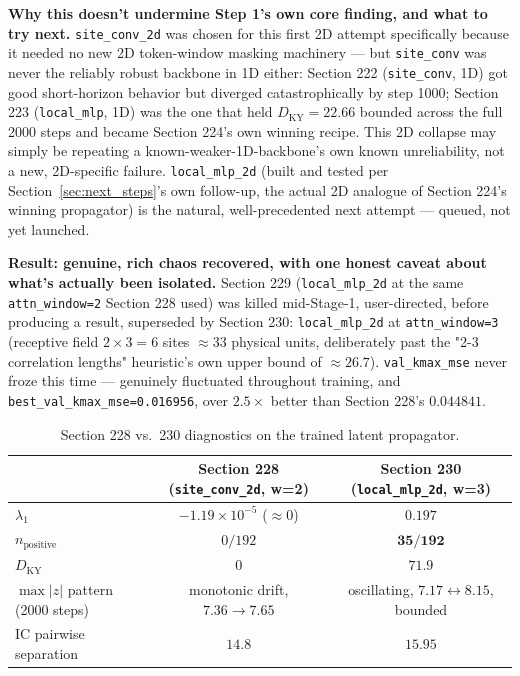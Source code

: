 \documentclass[11pt]{article}
\begin{document}
\textbf{Why this doesn't undermine Step 1's own core finding, and what
to try next.} \texttt{site\_conv\_2d} was chosen for this first 2D
attempt specifically because it needed no new 2D token-window masking
machinery --- but \texttt{site\_conv} was never the reliably robust
backbone in 1D either: Section 222 (\texttt{site\_conv}, 1D) got good
short-horizon behavior but diverged catastrophically by step 1000;
Section 223 (\texttt{local\_mlp}, 1D) was the one that held
$D_{\mathrm{KY}}=22.66$ bounded across the full 2000 steps and became
Section 224's own winning recipe. This 2D collapse may simply be
repeating a known-weaker-1D-backbone's own known unreliability, not a
new, 2D-specific failure. \texttt{local\_mlp\_2d} (built and tested per
Section~\ref{sec:next_steps}'s own follow-up, the actual 2D analogue of
Section 224's winning propagator) is the natural, well-precedented next
attempt --- queued, not yet launched.

\textbf{Result: genuine, rich chaos recovered, with one honest caveat
about what's actually been isolated.} Section 229
(\texttt{local\_mlp\_2d} at the same \texttt{attn\_window=2} Section
228 used) was killed mid-Stage-1, user-directed, before producing a
result, superseded by Section 230: \texttt{local\_mlp\_2d} at
\texttt{attn\_window=3} (receptive field $2\times3=6$ sites
$\approx33$ physical units, deliberately past the "2-3 correlation
lengths" heuristic's own upper bound of $\approx26.7$).
\texttt{val\_kmax\_mse} never froze this time --- genuinely fluctuated
throughout training, and \texttt{best\_val\_kmax\_mse=0.016956},
over $2.5\times$ better than Section 228's $0.044841$.

\begin{table}[h]
\centering
\begin{tabular}{lcc}
\toprule
 & Section 228 (\texttt{site\_conv\_2d}, w=2) & Section 230 (\texttt{local\_mlp\_2d}, w=3) \\
\midrule
$\lambda_1$ & $-1.19\times10^{-5}$ ($\approx0$) & $\mathbf{0.197}$ \\
$n_{\mathrm{positive}}$ & $0/192$ & $\mathbf{35/192}$ \\
$D_{\mathrm{KY}}$ & $0$ & $\mathbf{71.9}$ \\
$\max|z|$ pattern (2000 steps) & monotonic drift, $7.36\to7.65$ & oscillating, $7.17\leftrightarrow8.15$, bounded \\
IC pairwise separation & $14.8$ & $15.95$ \\
\bottomrule
\end{tabular}
\caption{Section 228 vs.\ 230 diagnostics on the trained latent propagator.}
\end{table}
\end{document}
